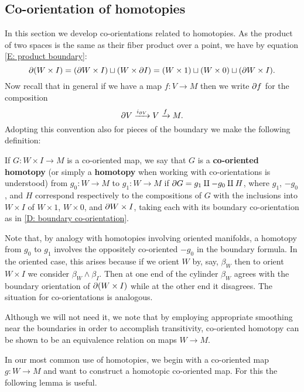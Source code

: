 \subsection{Co-orientation of homotopies}\label{S: co-oriented homotopy}

In this section we develop co-orientations related to homotopies.
As the product of two spaces is the same as their fiber product over a point, we have by equation \eqref{E: product boundary}:
\begin{equation*}
	\partial(W \times I) =
	(\partial W \times I) \sqcup (W \times \partial I) =
	(W \times 1) \sqcup (W \times 0) \sqcup (\partial W \times I).
\end{equation*}
Now recall that in general if we have a map $f \colon V \to M$ then we write $\partial f$ for the composition
$$\partial V \xrightarrow{i_{\partial V}} V \xrightarrow{f} M.$$
Adopting this convention also for pieces of the boundary we make the following definition:

\begin{definition}\label{D: co-oriented homotopy}
	If $G \colon W \times I \to M$ is a co-oriented map, we say that $G$ is a \textbf{co-oriented homotopy} (or simply a \textbf{homotopy} when working with co-orientations is understood) from $g_0 \colon W \to M$ to $g_1 \colon W \to M$ if $\partial G = g_1 \amalg -g_0\amalg H$, where $g_1$, $-g_0$, and $H$ correspond respectively to the compositions of $G$ with the inclusions into $W \times I$ of $W \times 1$, $W \times 0$, and $\partial W \times I$, taking each with its boundary co-orientation as in \cref{D: boundary co-orientation}.
\end{definition}

Note that, by analogy with homotopies involving oriented manifolds, a homotopy from $g_0$ to $g_1$ involves the oppositely co-oriented $-g_0$ in the boundary formula.
In the oriented case, this arises because if we orient $W$ by, say, $\beta_W$ then to orient $W \times I$ we consider $\beta_W \wedge \beta_I$.
Then at one end of the cylinder $\beta_W$ agrees with the boundary orientation of $\partial (W \times I)$ while at the other end it disagrees.
The situation for co-orientations is analogous.

Although we will not need it, we note that by employing appropriate smoothing near the boundaries in order to accomplish transitivity, co-oriented homotopy can be shown to be an equivalence relation on maps $W \to M$.

In our most common use of homotopies, we begin with a co-oriented map $g \colon W \to M$ and want to construct a homotopic co-oriented map.
For this the following lemma is useful.

